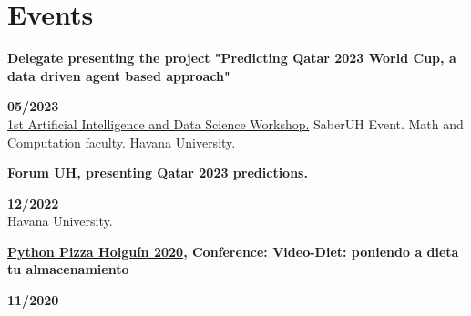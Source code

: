\documentclass[a4paper,12pt]{article}
\begin{document}
\section*{Events}
\begin{minipage}{\textwidth}
    \parbox{0.8\linewidth}{\textbf{Delegate presenting the project "Predicting Qatar 2023 World Cup, a data driven agent based approach" }} \hfill \textbf{05/2023}\\
    \hyperref[sec:workshop]{1st Artificial Intelligence and Data Science Workshop.} SaberUH Event. Math and Computation faculty. Havana University.\\
\end{minipage}
\begin{minipage}{\textwidth}
    \parbox{0.8\linewidth}{\textbf{Forum UH, presenting Qatar 2023 predictions.}} \hfill \textbf{12/2022}\\
    Havana University.\\
\end{minipage}
\begin{minipage}{\textwidth}
    \parbox{0.8\linewidth}{\textbf{\hyperref[sec:pythonpizza]{Python Pizza Holguín 2020}, Conference: Video-Diet: poniendo a dieta tu almacenamiento}} \hfill \textbf{11/2020}\\
\end{minipage}
\begin{minipage}{\textwidth}
    \parbox{0.8\linewidth}{\textbf{}} \hfill \textbf{}\\
    \\
\end{minipage}
\begin{minipage}{\textwidth}
    \parbox{0.8\linewidth}{\textbf{}} \hfill \textbf{}\\
    \\
\end{minipage}
\begin{minipage}{\textwidth}
    \parbox{0.8\linewidth}{\textbf{}} \hfill \textbf{}\\
    \\
\end{minipage}
\begin{minipage}{\textwidth}
    \parbox{0.8\linewidth}{\textbf{}} \hfill \textbf{}\\
    \\
\end{minipage}
\end{document}

